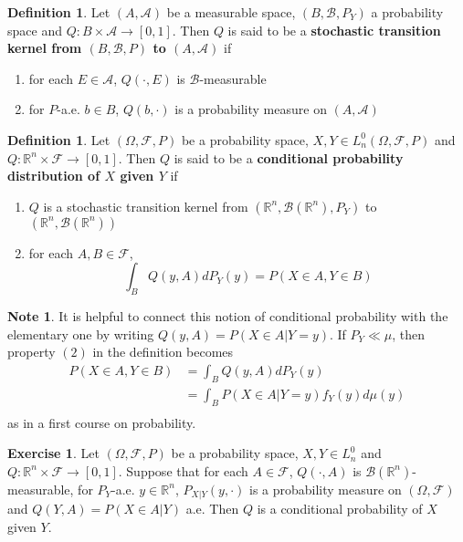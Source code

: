 \documentclass[12pt]{amsart}
\theoremstyle{definition}
\newtheorem{defn}[definition]{Definition}
\newtheorem{note}[definition]{Note}
\newtheorem{ex}[definition]{Exercise}
\newcommand{\Om}{\Omega}
\newcommand{\R}{\mathbb{R}}
\newcommand{\MA}{\mathcal{A}}
\newcommand{\MB}{\mathcal{B}}
\newcommand{\MF}{\mathcal{F}}
\begin{document}
	\begin{defn}
	Let $(A, \MA)$ be a measurable space, $(B, \MB, P_Y)$ a probability space and $Q:B \times \MA \rightarrow [0,1]$. Then $Q$ is said to be a \textbf{stochastic transition kernel from $(B, \MB, P)$ to $(A, \MA)$} if 
	\begin{enumerate}
	\item for each $E \in \MA$, $Q(\cdot, E)$ is $\MB$-measurable
	\item for $P$-a.e. $b \in B$, $Q(b, \cdot)$ is a probability measure on $(A, \MA)$
	\end{enumerate}
	\end{defn}	
	
	\begin{defn}
	Let $(\Om, \MF, P)$ be a probability space, $X,Y \in L_n^0(\Om, \MF, P)$ and $Q: \R^n  \times \MF \rightarrow [0,1]$. Then $Q$ is said to be a \textbf{conditional probability distribution of $X$ given $Y$} if 
	\begin{enumerate}
	\item $Q$ is a stochastic transition kernel from $(\R^n, \MB(\R^n), P_Y)$ to $(\R^n, \MB(\R^n))$
	\item for each $A,B \in \MF$, $$\int_B Q(y, A) dP_Y(y) = P(X \in A, Y \in B)$$ 
	\end{enumerate}
	\end{defn}
	
	\begin{note}
	It is helpful to connect this notion of conditional probability with the elementary one by writing $Q(y, A) = P(X \in A| Y = y)$. If $P_Y \ll \mu$, then property $(2)$ in the definition becomes 
	\begin{align*}
	P(X \in A, Y \in B)  
	&=  \int_B Q(y, A) dP_Y(y) \\
	&= \int_B P(X \in A|Y=y) f_Y(y)d \mu(y) \\
\end{align*}	 
	as in a first course on probability.
	\end{note}	
	
	\begin{ex}
	Let $(\Om, \MF, P)$ be a probability space, $X,Y \in L_n^0$ and $Q: \R^n \times \MF \rightarrow [0,1]$. Suppose that for each $A \in \MF$, $Q(\cdot, A)$ is $\MB(\R^n)$-measurable, for $P_Y$-a.e. $y \in \R^n$, $P_{X|Y}(y, \cdot)$ is a probability measure on $(\Om, \MF)$ and $Q(Y, A) = P(X \in A|Y)$ a.e. Then $Q$ is a conditional probability of $X$ given $Y$.
	\end{ex}	
	
\end{document}
